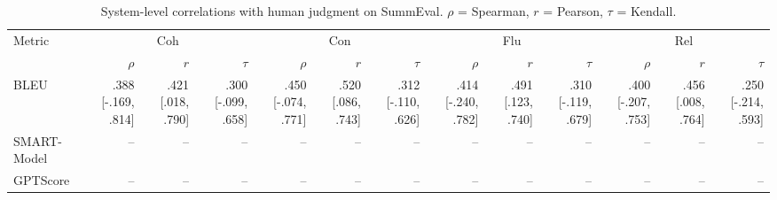 \begin{table}[t]
\centering
\caption{System-level correlations with human judgment on SummEval. $\rho$ = Spearman, $r$ = Pearson, $\tau$ = Kendall.}
\label{tab:correlations_system}
\begin{tabular}{lrrrrrrrrrrrr}
\toprule
Metric & \multicolumn{3}{c}{Coh} & \multicolumn{3}{c}{Con} & \multicolumn{3}{c}{Flu} & \multicolumn{3}{c}{Rel} \\
\cmidrule(lr){2-4} \cmidrule(lr){5-7} \cmidrule(lr){8-10} \cmidrule(lr){11-13} 
  & $\rho$ & $r$ & $\tau$ & $\rho$ & $r$ & $\tau$ & $\rho$ & $r$ & $\tau$ & $\rho$ & $r$ & $\tau$ \\
\midrule
BLEU & .388 {\scriptsize [-.169, .814]} & .421 {\scriptsize [.018, .790]} & .300 {\scriptsize [-.099, .658]} & .450 {\scriptsize [-.074, .771]} & .520 {\scriptsize [.086, .743]} & .312 {\scriptsize [-.110, .626]} & .414 {\scriptsize [-.240, .782]} & .491 {\scriptsize [.123, .740]} & .310 {\scriptsize [-.119, .679]} & .400 {\scriptsize [-.207, .753]} & .456 {\scriptsize [.008, .764]} & .250 {\scriptsize [-.214, .593]} \\
SMART-Model & -- & -- & -- & -- & -- & -- & -- & -- & -- & -- & -- & -- \\
GPTScore & -- & -- & -- & -- & -- & -- & -- & -- & -- & -- & -- & -- \\
\bottomrule
\end{tabular}
\end{table}

